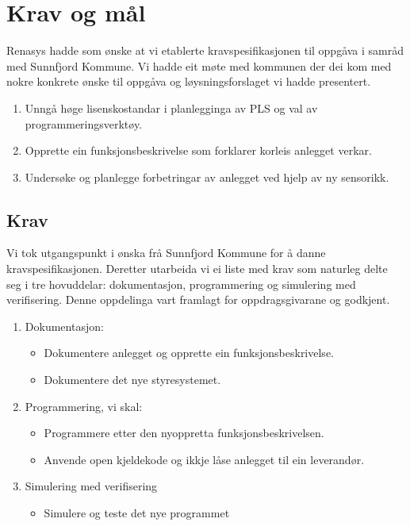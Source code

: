 \chapter{Krav og mål}
\thispagestyle{fancy}
\label{sec: 5}

\gls{Renasys} hadde som ønske at vi etablerte kravspesifikasjonen til oppgåva 
i samråd med \gls{Sunnfjord Kommune}.\newline
Vi hadde eit møte med kommunen der dei kom med nokre konkrete ønske til oppgåva
og løysningsforslaget vi hadde presentert.

\begin{enumerate}
    \item Unngå høge lisenskostandar i planlegginga av PLS og val av programmeringsverktøy.
    \item Opprette ein funksjonsbeskrivelse som forklarer korleis anlegget verkar.
    \item Undersøke og planlegge forbetringar av anlegget ved hjelp av ny sensorikk.
\end{enumerate}

\section{Krav}
Vi tok utgangspunkt i ønska frå \gls{Sunnfjord Kommune} for å danne kravspesifikasjonen.
Deretter utarbeida vi ei liste med krav som naturleg delte seg i tre
hovuddelar: dokumentasjon, programmering og simulering med verifisering. 
Denne oppdelinga vart framlagt for oppdragsgivarane og godkjent. 

\begin{enumerate}
    \item Dokumentasjon:
    \begin{itemize}
        \item Dokumentere anlegget og opprette ein funksjonsbeskrivelse.
        \item Dokumentere det nye styresystemet.
    \end{itemize}
    \item Programmering, vi skal:
    \begin{itemize}
        \item Programmere etter den nyoppretta funksjonsbeskrivelsen.
        \item Anvende open kjeldekode og ikkje låse anlegget til ein leverandør.
    \end{itemize}
    \item Simulering med verifisering
    \begin{itemize}
        \item Simulere og teste det nye programmet
    \end{itemize}
\end{enumerate}


